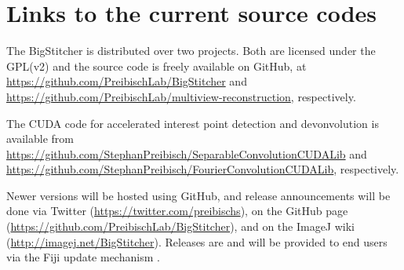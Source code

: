 
\section{Links to the current source codes}
\label{sec:currentcode}

The BigStitcher is distributed over two projects. Both are licensed under the GPL(v2) and the source code is freely available on GitHub, at \url{https://github.com/PreibischLab/BigStitcher} and \url{https://github.com/PreibischLab/multiview-reconstruction}, respectively.

The CUDA code for accelerated interest point detection and devonvolution is available from \url{https://github.com/StephanPreibisch/SeparableConvolutionCUDALib} and \url{https://github.com/StephanPreibisch/FourierConvolutionCUDALib}, respectively.

Newer versions will be hosted using GitHub, and release announcements will be done via Twitter (\url{https://twitter.com/preibischs}), on the GitHub page (\url{https://github.com/PreibischLab/BigStitcher}), and on the ImageJ wiki (\url{http://imagej.net/BigStitcher}). Releases are and will be provided to end users via the Fiji update mechanism \cite{imagej}.